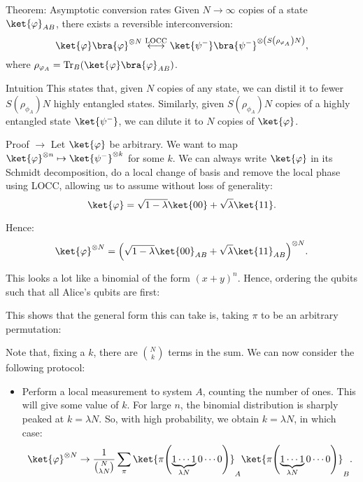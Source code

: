\documentclass[a4paper]{article}
\begin{document}
\begin{parag}{Theorem: Asymptotic conversion rates}
    Given $N \to \infty$ copies of a state $\ket{\phi}_{AB}$, there exists a reversible interconversion: 
    \[\ket{\phi}\bra{\phi}^{\otimes N} \over{\longleftrightarrow}{LOCC} \ket{\psi^-}\bra{\psi^-}^{\otimes \left(S\left(\rho_{\phi_A}\right) N\right)},\]
    where $\rho_{\phi_A} = \Tr_B\left(\ket{\phi}\bra{\phi}_{AB}\right)$.
    
    \begin{subparag}{Intuition}
        This states that, given $N$ copies of any state, we can distil it to fewer $S\left(\rho_{\phi_A}\right) N$ highly entangled states. Similarly, given $S\left(\rho_{\phi_A}\right)N$ copies of a highly entangled state $\ket{\psi^-}$, we can dilute it to $N$ copies of $\ket{\phi}$.
    \end{subparag}

    \begin{subparag}{Proof $\to$}
        Let $\ket{\phi}$ be arbitrary. We want to map $\ket{\phi}^{\otimes n} \mapsto \ket{\psi^-}^{\otimes k}$ for some $k$. We can always write $\ket{\phi}$ in its Schmidt decomposition, do a local change of basis and remove the local phase using LOCC, allowing us to assume without loss of generality: 
        \[\ket{\phi} = \sqrt{1 - \lambda} \ket{00} + \sqrt{\lambda} \ket{11}.\]
        
        Hence: 
        \[\ket{\phi}^{\otimes N} = \left(\sqrt{1- \lambda}\ket{00}_{AB} + \sqrt{\lambda} \ket{11}_{AB}\right)^{\otimes N}.\]

        This looks a lot like a binomial of the form $\left(x + y\right)^{n}$. Hence, ordering the qubits such that all Alice's qubits are first: 
        
        This shows that the general form this can take is, taking $\pi$ to be an arbitrary permutation: 
        
        Note that, fixing a $k$, there are $\binom{N}{k}$ terms in the sum. We can now consider the following protocol:
        \begin{itemize}
            \item Perform a local measurement to system $A$, counting the number of ones. This will give some value of $k$. For large $n$, the binomial distribution is sharply peaked at $k = \lambda N$. So, with high probability, we obtain $k = \lambda N$, in which case: 
            \[\ket{\phi}^{\otimes N} \to \frac{1}{\binom{N}{\lambda N}} \sum_{\pi} \ket{\pi \left(\underbrace{1\cdots 1}_{\lambda N} 0 \cdots 0\right)}_A \ket{\pi \left(\underbrace{1\cdots 1}_{\lambda N} 0 \cdots 0\right)}_B.\]


\end{itemize}
\end{subparag}
\end{parag}
\end{document}
